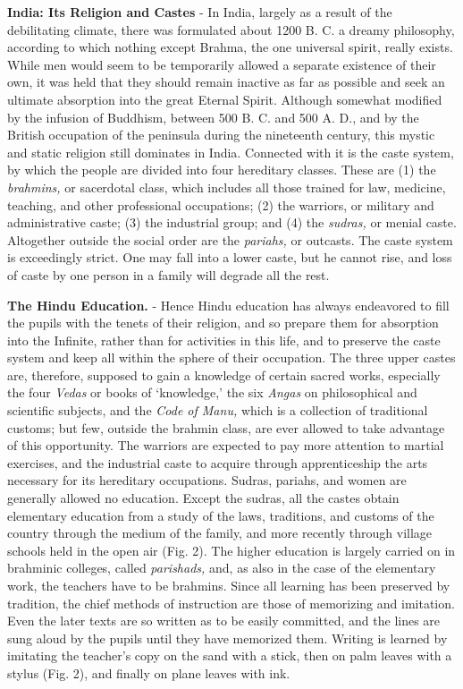 \documentclass[
]{book}
\begin{document}
\textbf{India: Its Religion and Castes} - In India, largely as a result of the debilitating climate, there was formulated about 1200 B. C. a dreamy philosophy, according to which nothing except Brahma, the one universal spirit, really exists. While men would seem to be temporarily allowed a separate existence of their own, it was held that they should remain inactive as far as possible and seek an ultimate absorption into the great Eternal Spirit. Although somewhat modified by the infusion of Buddhism, between 500 B. C. and 500 A. D., and by the British occupation of the peninsula during the nineteenth century, this mystic and static religion still dominates in India. Connected with it is the caste system, by which the people are divided into four hereditary classes. These are (1) the \emph{brahmins,} or sacerdotal class, which includes all those trained for law, medicine, teaching, and other professional occupations; (2) the warriors, or military and administrative caste; (3) the industrial group; and (4) the \emph{sudras,} or menial caste. Altogether outside the social order are the \emph{pariahs,} or outcasts. The caste system is exceedingly strict. One may fall into a lower caste, but he cannot rise, and loss of caste by one person in a family will degrade all the rest.

\textbf{The Hindu Education.} - Hence Hindu education has always endeavored to fill the pupils with the tenets of their religion, and so prepare them for absorption into the Infinite, rather than for activities in this life, and to preserve the caste system and keep all within the sphere of their occupation. The three upper castes are, therefore, supposed to gain a knowledge of certain sacred works, especially the four \emph{Vedas} or books of `knowledge,' the six \emph{Angas} on philosophical and scientific subjects, and the \emph{Code of Manu,} which is a collection of traditional customs; but few, outside the brahmin class, are ever allowed to take advantage of this opportunity. The warriors are expected to pay more attention to martial exercises, and the industrial caste to acquire through apprenticeship the arts necessary for its hereditary occupations. Sudras, pariahs, and women are generally allowed no education. Except the sudras, all the castes obtain elementary education from a study of the laws, traditions, and customs of the country through the medium of the family, and more recently through village schools held in the open air (Fig. 2). The higher education is largely carried on in brahminic colleges, called \emph{parishads,} and, as also in the case of the elementary work, the teachers have to be brahmins. Since all learning has been preserved by tradition, the chief methods of instruction are those of memorizing and imitation. Even the later texts are so written as to be easily committed, and the lines are sung aloud by the pupils until they have memorized them. Writing is learned by imitating the teacher's copy on the sand with a stick, then on palm leaves with a stylus (Fig. 2), and finally on plane leaves with ink.
\end{document}
